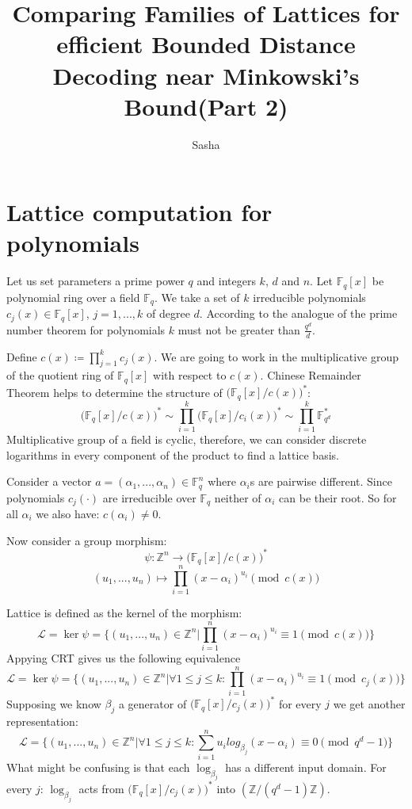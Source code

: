 \documentclass[12pt]{article}
\title{Comparing Families of Lattices for efficient Bounded Distance Decoding near Minkowski’s Bound(Part 2)}
\author{ Sasha }
\newcommand{\FF}{\mathbb{F}}
\newcommand{\ZZ}{\mathbb{Z}}
\newcommand{\LL}{\mathcal{L}}
\begin{document}
\maketitle

\section{Lattice computation for polynomials}
Let us set parameters a prime power $q$ and integers $k$, $d$ and $n$. Let $\FF_{q}[x]$ be polynomial ring over a field  $\FF_{q}$. We take a set of $k$ irreducible polynomials $c_{j}(x) \in \FF_{q}[x]$, $j =1, ...,k$ of degree $d$. According to the analogue of the prime number theorem for polynomials $k$ must not be greater than $\frac{q^d}{d}$.

Define $c(x) \coloneqq \prod_{j = 1}^{k} c_{j}(x)$. We are going to work in the multiplicative group of the quotient ring of  $\FF_{q}[x]$ with respect to $c(x)$.
Chinese Remainder Theorem helps to determine the structure of $\big(\FF_{q}[x]/c(x)\big)^{*}$:
\[
    \big(\FF_{q}[x]/c(x)\big)^{*} \sim \prod_{i=1}^{k}\big(\FF_{q}[x]/c_{i}(x)\big)^{*} \sim \prod_{i=1}^{k}\FF_{q^{d}}^*
\]
Multiplicative group of a field is cyclic, therefore, we can consider discrete logarithms in every component of the product to find a lattice basis.

Consider a vector $a = (\alpha_{1}, ... , \alpha_{n}) \in \FF_{q}^{n}$ where $\alpha_{i}$s are pairwise different. Since polynomials $c_{j}(\cdot)$ are irreducible over $\FF_{q}$ neither of $\alpha_{i}$ can be their root. So for all $\alpha_{i}$ we also have: $c(\alpha_{i}) \neq 0$.

Now consider a group morphism:
\[
    \psi : \ZZ^{n} \rightarrow \big(\FF_{q}[x]/c(x)\big)^{*}
\]
\[
    (u_{1}, ..., u_{n}) \mapsto \prod_{i=1}^{n}(x - \alpha_{i})^{u_{i}} \pmod{c(x)}
\]

Lattice is defined as the kernel of the morphism:
\[
    \LL = \ker \psi = \{(u_{1}, ..., u_{n}) \in \ZZ^{n} | \prod_{i=1}^{n}(x - \alpha_{i})^{u_{i}} \equiv 1 \pmod{c(x)}\}
\]
Appying CRT gives us the following equivalence
\[
    \LL = \ker \psi = \{(u_{1}, ..., u_{n}) \in \ZZ^{n} |  \forall 1 \leq j \leq k: \prod_{i=1}^{n}(x - \alpha_{i})^{u_{i}} \equiv 1 \pmod{c_{j}(x)}\}
\]
Supposing we know $\beta_{j}$ a generator of $\big(\FF_{q}[x]/c_{j}(x)\big)^{*}$ for every $j$ we get another representation:
\[
    \LL = \{(u_{1}, ..., u_{n}) \in \ZZ^{n} | \forall 1 \leq j \leq k: \sum_{i=1}^{n}u_{i}log_{\beta_{j}}(x - \alpha_{i}) \equiv 0 \pmod{q^{d} -1}\}
\]
What might be confusing is that each $\log_{\beta_{j}}$ has a different input domain. For every $j$:  $\log_{\beta_{j}}$ acts from $\big(\FF_{q}[x]/c_{j}(x)\big)^{*}$ into $(\ZZ/(q^{d} - 1)\ZZ)$.
\end{document}
